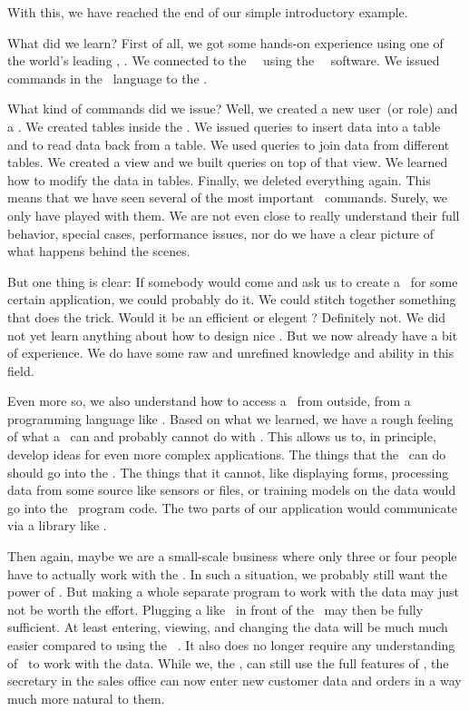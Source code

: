 %
%
%
With this, we have reached the end of our simple introductory example.

What did we learn?
First of all, we got some hands-on experience using one of the world's leading , \postgresql.
We connected to the \postgresql\ \server\ using the \psql\ \client\ software.
We issued commands in the \sql\ language to the \dbms.

What kind of commands did we issue?
Well, we created a new user~(or role) and a \db.
We created tables inside the \db.
We issued queries to insert data into a table and to read data back from a table.
We used queries to join data from different tables.
We created a view and we built queries on top of that view.
We learned how to modify the data in tables.
Finally, we deleted everything again.
This means that we have seen several of the most important \sql\ commands.
Surely, we only have played with them.
We are not even close to really understand their full behavior, special cases, performance issues, nor do we have a clear picture of what happens behind the scenes.

But one thing is clear:
If somebody would come and ask us to create a \db\ for some certain application, we could probably do it.
We could stitch together something that does the trick.
Would it be an efficient or elegent \db?
Definitely not.
We did not yet learn anything about how to design nice .
But we now already have a bit of experience.
We do have some raw and unrefined knowledge and ability in this field.

Even more so, we also understand how to access a \db\ from outside, from a programming language like \python.
Based on what we learned, we have a rough feeling of what a \dbms\ can and probably cannot do with \sql.
This allows us to, in principle, develop ideas for even more complex applications.
The things that the \dbms\ can do should go into the \db.
The things that it cannot, like displaying forms, processing data from some source like sensors or files, or training  models on the data would go into the \python\ program code.
The two parts of our application would communicate via a library like \psycopg.

Then again, maybe we are a small-scale business where only three or four people have to actually work with the \db.
In such a situation, we probably still want the power of \postgresql.
But making a whole separate program to work with the data may just not be worth the effort.
Plugging a  like \libreofficeBase\ in front of the \db\ may then be fully sufficient.
At least entering, viewing, and changing the data will be much much easier compared to using the \psql\ \client.
It also does no longer require any understanding of \sql\ to work with the data.
While we, the , can still use the full features of \postgresql, the secretary in the sales office can now enter new customer data and orders in a way much more natural to them.

